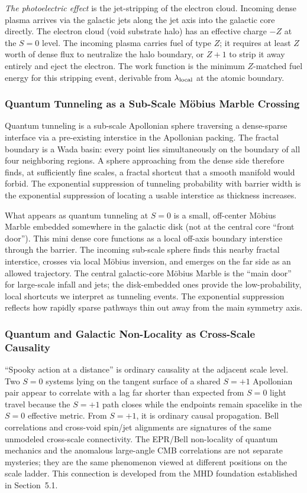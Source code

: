 \documentclass[11pt,letterpaper]{article}
\begin{document}
\textit{The photoelectric effect} is the jet-stripping of the electron cloud.
Incoming dense plasma arrives via the galactic jets along the jet axis into the
galactic core directly. The electron cloud (void substrate halo) has an effective
charge $-Z$ at the $S{=}0$ level. The incoming plasma carries fuel of type $Z$; it
requires at least $Z$ worth of dense flux to neutralize the halo boundary, or
$Z{+}1$ to strip it away entirely and eject the electron. The work function is the
minimum $Z$-matched fuel energy for this stripping event, derivable from
$\lambda_{\rm local}$ at the atomic boundary.

\subsubsection{Quantum Tunneling as a Sub-Scale M\"obius Marble Crossing}
\label{sec:tunneling}
Quantum tunneling is a sub-scale Apollonian sphere traversing a dense-sparse
interface via a pre-existing interstice in the Apollonian packing. The fractal
boundary is a Wada basin: every point lies simultaneously on the boundary of all
four neighboring regions. A sphere approaching from the dense side therefore finds,
at sufficiently fine scales, a fractal shortcut that a smooth manifold would forbid.
The exponential suppression of tunneling probability with barrier width is the
exponential suppression of locating a usable interstice as thickness increases.

What appears as quantum tunneling at $S{=}0$ is a small, off-center M\"obius Marble
embedded somewhere in the galactic disk (not at the central core ``front door'').
This mini dense core functions as a local off-axis boundary interstice through the
barrier. The incoming sub-scale sphere finds this nearby fractal interstice, crosses
via local M\"obius inversion, and emerges on the far side as an allowed trajectory.
The central galactic-core M\"obius Marble is the ``main door'' for large-scale
infall and jets; the disk-embedded ones provide the low-probability, local shortcuts
we interpret as tunneling events. The exponential suppression reflects how rapidly
sparse pathways thin out away from the main symmetry axis.

\subsubsection{Quantum and Galactic Non-Locality as Cross-Scale Causality}
\label{sec:nonlocality}
``Spooky action at a distance'' is ordinary causality at the adjacent scale level.
Two $S{=}0$ systems lying on the tangent surface of a shared $S{=}+1$ Apollonian
pair appear to correlate with a lag far shorter than expected from $S{=}0$ light
travel because the $S{=}+1$ path closes while the endpoints remain spacelike in the
$S{=}0$ effective metric. From $S{=}+1$, it is ordinary causal propagation. Bell
correlations and cross-void spin/jet alignments are signatures of the same unmodeled
cross-scale connectivity. The EPR/Bell non-locality of quantum mechanics and the
anomalous large-angle CMB correlations are not separate mysteries; they are the same
phenomenon viewed at different positions on the scale ladder. This connection is
developed from the MHD foundation established in \cite{FSEP-I} Section~5.1.
\end{document}

